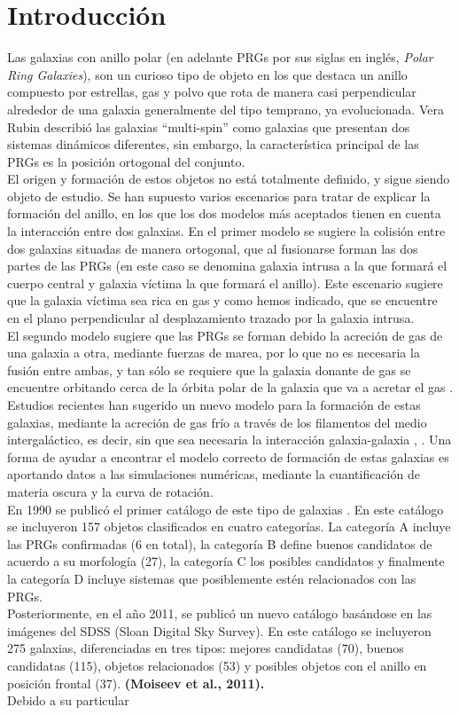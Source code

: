 \documentclass{article}
\begin{document}
\section{Introducción}
Las galaxias con anillo polar (en adelante PRGs por sus siglas en inglés, \emph{Polar Ring Galaxies}), son un curioso tipo de objeto en los que destaca un anillo compuesto por estrellas, gas y polvo que rota de manera casi perpendicular alrededor de una galaxia generalmente del tipo temprano, ya evolucionada. Vera Rubin describió las galaxias ``multi-spin'' como galaxias que presentan dos sistemas dinámicos diferentes\cite{Rubin1994d}, sin embargo, la característica principal de las PRGs es la posición ortogonal del conjunto.\\El origen y formación de estos objetos no está totalmente definido, y sigue siendo objeto de estudio. Se han supuesto varios escenarios para tratar de explicar la formación del anillo, en los que los dos modelos más aceptados tienen en cuenta la interacción entre dos galaxias. En el primer modelo se sugiere la colisión entre dos galaxias situadas de manera ortogonal, que al fusionarse forman las dos partes de las PRGs (en este caso se denomina galaxia intrusa a la que formará el cuerpo central y galaxia víctima la que formará el anillo). Este escenario sugiere que la galaxia víctima sea rica en gas y como hemos indicado, que se encuentre en el plano perpendicular al desplazamiento trazado por la galaxia intrusa\cite{Bournaud2003}.\\El segundo modelo sugiere que las PRGs se forman debido la acreción de gas de una galaxia a otra, mediante fuerzas de marea, por lo que no es necesaria la fusión entre ambas, y tan sólo se requiere que la galaxia donante de gas se encuentre orbitando cerca de la órbita polar de la galaxia que va a acretar el gas \cite{Bournaud2003}. Estudios recientes han sugerido un nuevo modelo para la formación de estas galaxias, mediante la acreción de gas frío a través de los filamentos del medio intergaláctico, es decir, sin que sea necesaria la interacción galaxia-galaxia \cite{Brook2008}, \cite{Iodice2014}. Una forma de ayudar a encontrar el modelo correcto de formación de estas galaxias es aportando datos a las simulaciones numéricas, mediante la cuantificación de materia oscura y la curva de rotación.\\En 1990 se publicó el primer catálogo de este tipo de galaxias \cite{Whitmore1990}. En este catálogo se incluyeron 157 objetos clasificados en cuatro categorías. La categoría A incluye las PRGs confirmadas (6 en total), la categoría B define buenos candidatos de acuerdo a su morfología (27), la categoría C los posibles candidatos y finalmente la categoría D incluye sistemas que posiblemente estén relacionados con las PRGs.\\Posteriormente, en el año 2011, se publicó un nuevo catálogo basándose en las imágenes del SDSS (Sloan Digital Sky Survey). En este catálogo se incluyeron 275 galaxias, diferenciadas en tres tipos: mejores candidatas (70), buenos candidatas (115), objetos relacionados (53) y posibles objetos con el anillo en posición frontal (37). \textbf{(Moiseev et al., 2011).}\\Debido a su particular 
\end{document}
